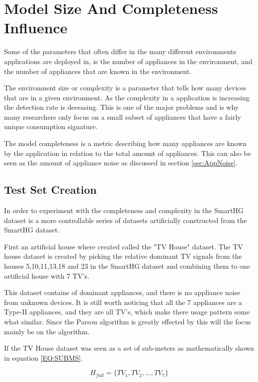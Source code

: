 \section{Model Size And Completeness Influence }
Some of the parameters that often differ in the many different environments  applications are deployed in, is the number of appliances in the environment, and the number of appliances that are known in the environment.  

The environment size or complexity is a parameter that tells how many devices that are in a given environment. As the complexity in a  application is increasing the detection rate is deceasing\citep{RefWorks:34}. This is one of the major problems and is why many researchers only focus on a small subset of appliances that have a fairly unique consumption signature. 

The model completeness is a metric describing how many appliances are known by the application in relation to the total amount of appliances. This can also be seen as the amount of appliance noise as discussed in section \ref{sec:AppNoise}.

\subsection{Test Set Creation}
\label{sec:datasetCreation}
In order to experiment with the completeness and complexity in the SmartHG dataset is a more controllable series of datasets artificially constructed from the SmartHG dataset. 

First an artificial house where created called the "TV House" dataset. The TV house dataset is created by picking the relative dominant TV signals from the houses 5,10,11,13,18 and 23 in the SmartHG dataset and combining them to one artificial house with 7 TV's. 

This dataset contains of dominant appliances, and there is no appliance noise from unknown devices. It is still worth noticing that all the 7 appliances are a Type-II appliances, and they are all TV's, which make there usage pattern some what similar. Since the Parson algorithm is greatly effected by this will the focus mainly be on the  algorithm. 

If the TV House dataset was seen as a set of sub-meters as mathematically shown in equation \ref{EQ:SUBMS}. 

\begin{equation}
	H_{full} = \{ TV_1, TV_2, ... , TV_7 \}
	\label{EQ:SUBMS}
\end{equation}

